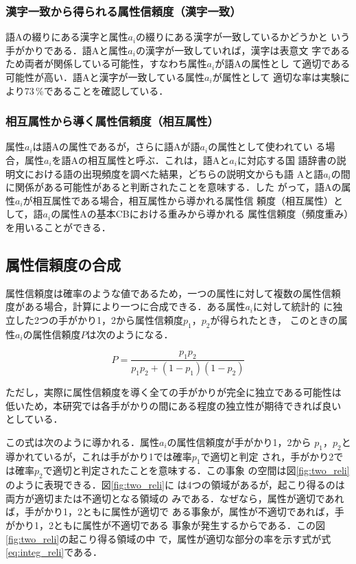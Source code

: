 \subsubsection{漢字一致から得られる属性信頼度（漢字一致）}

語Aの綴りにある漢字と属性$a_i$の綴りにある漢字が一致しているかどうかと
いう手がかりである．語Aと属性$a_i$の漢字が一致していれば，漢字は表意文
字であるため両者が関係している可能性，すなわち属性$a_i$が語Aの属性とし
て適切である可能性が高い．語Aと漢字が一致している属性$a_i$が属性として
適切な率は実験により73\,\%であることを確認している．

\subsubsection{相互属性から導く属性信頼度（相互属性）}

属性$a_i$は語Aの属性であるが，さらに語Aが語$a_i$の属性として使われてい
る場合，属性$a_i$を語Aの相互属性と呼ぶ．これは，語Aと$a_i$に対応する国
語辞書の説明文における語の出現頻度を調べた結果，どちらの説明文からも語
Aと語$a_i$の間に関係がある可能性があると判断されたことを意味する．した
がって，語Aの属性$a_i$が相互属性である場合，相互属性から導かれる属性信
頼度（相互属性）として，語$a_i$の属性Aの基本CBにおける重みから導かれる
属性信頼度（頻度重み）を用いることができる．

\subsection{属性信頼度の合成}

属性信頼度は確率のような値であるため，一つの属性に対して複数の属性信頼
度がある場合，計算により一つに合成できる．ある属性$a_i$に対して統計的
に独立した2つの手がかり1，2から属性信頼度$p_1$，$p_2$が得られたとき，
このときの属性$a_i$の属性信頼度$P$は次のようになる．

\begin{equation}
  P = \frac{p_1 p_2}{p_1 p_2 + (1-p_1)(1-p_2) }
  \label{eq:integ_reli}
\end{equation}

ただし，実際に属性信頼度を導く全ての手がかりが完全に独立である可能性は
低いため，本研究では各手がかりの間にある程度の独立性が期待できれば良い
としている．

この式は次のように導かれる．属性$a_i$の属性信頼度が手がかり1，2から
$p_1$，$p_2$と導かれているが，これは手がかり1では確率$p_1$で適切と判定
され，手がかり2では確率$p_2$で適切と判定されたことを意味する．この事象
の空間は図\ref{fig:two_reli}のように表現できる．図\ref{fig:two_reli}に
は4つの領域があるが，起こり得るのは両方が適切または不適切となる領域の
みである．なぜなら，属性が適切であれば，手がかり1，2ともに属性が適切で
ある事象が，属性が不適切であれば，手がかり1，2ともに属性が不適切である
事象が発生するからである．この図\ref{fig:two_reli}の起こり得る領域の中
で，属性が適切な部分の率を示す式が式\ref{eq:integ_reli}である．

